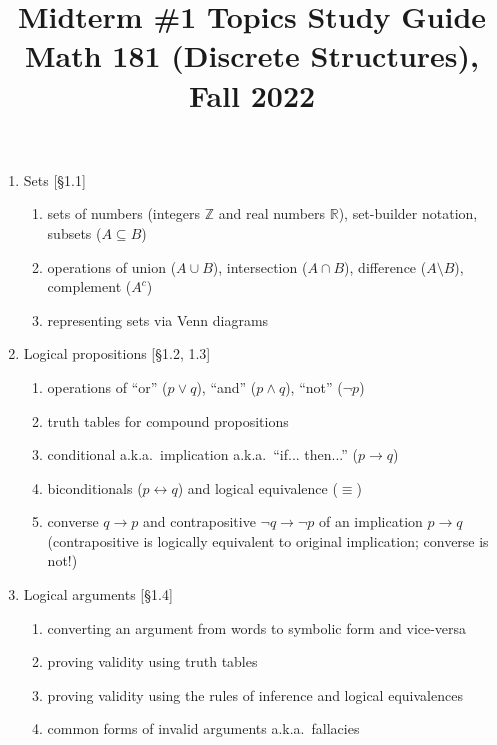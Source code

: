 \documentclass[11pt]{article}
\title{Midterm \#1 Topics Study Guide \\Math 181 (Discrete Structures), Fall 2022}
\date{}
\begin{document}
\maketitle

\thispagestyle{empty}

\vspace{-1cm}

\begin{enumerate}
\item Sets [\S1.1] 
\begin{enumerate}
\item sets of numbers (integers $\mathbb{Z}$ and real numbers $\mathbb{R}$), set-builder notation, subsets ($A \subseteq B$)
\item operations of union ($A \cup B$), intersection ($A \cap B$), difference ($A \setminus B$), complement ($A^c$)
\item representing sets via Venn diagrams
\end{enumerate}

\item Logical propositions [\S1.2, 1.3]
\begin{enumerate}
\item operations of ``or'' ($p \vee q$), ``and'' ($p \wedge q$), ``not'' ($\neg p$)
\item truth tables for compound propositions 
\item conditional a.k.a.~implication a.k.a.~``if... then...'' ($p \to q$)
\item biconditionals ($p \leftrightarrow q$) and logical equivalence ($\equiv$)
\item converse $q \to p$ and contrapositive $\neg q \to \neg p$ of an implication $p\to q$ \\
(contrapositive is logically equivalent to original implication; converse is not!)
\end{enumerate}

\item Logical arguments [\S1.4]
\begin{enumerate}
\item converting an argument from words to symbolic form and vice-versa
\item proving validity using truth tables
\item proving validity using the rules of inference and logical equivalences
\item common forms of invalid arguments a.k.a.~fallacies
\end{enumerate}


\end{enumerate}
\end{document}
